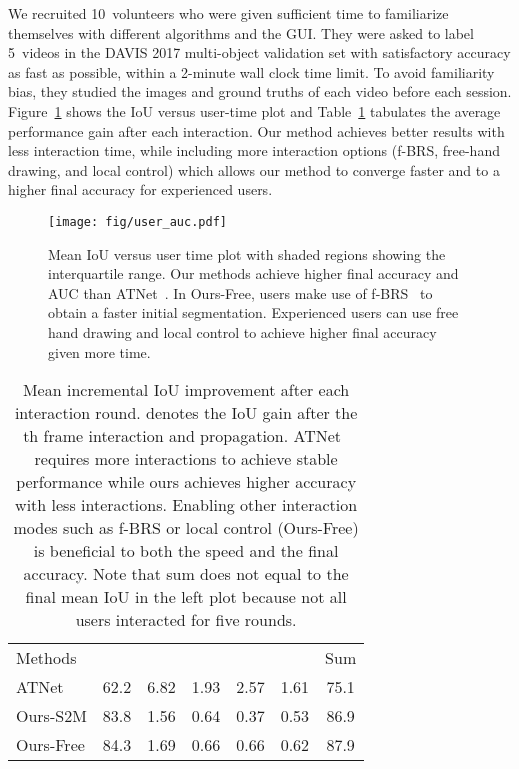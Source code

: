 \documentclass[final]{cvpr}
\begin{document}
	We recruited 10~volunteers who were given sufficient time to familiarize themselves with different algorithms and the GUI. They were asked to label 5~videos in the DAVIS 2017 multi-object validation set with satisfactory accuracy as fast as possible, within a 2-minute wall clock time limit. To avoid familiarity bias, they studied the images and ground truths of each video before each session. Figure~\ref{fig:user_auc} shows the IoU versus user-time plot and Table~\ref{tab:user_delta} tabulates the average performance gain after each interaction. Our method achieves better results with less interaction time, while including more interaction options (f-BRS, free-hand drawing, and local control) which allows our method to converge faster and to a higher final accuracy for experienced users.


	\begin{figure}[h]
		\begin{center}
			\texttt{[image: fig/user\_auc.pdf]}
		\end{center}
		\vspace{-0.2in}
		\caption{
			Mean IoU versus user time plot with shaded regions showing the interquartile range. Our methods achieve higher final accuracy and AUC than ATNet~\cite{Yuk2020IVOSGlobalLocal}. In Ours-Free, users make use of f-BRS~\cite{sofiiuk2020fbrs} to obtain a faster initial segmentation. Experienced users can use free hand drawing and local control to achieve  higher final accuracy given more time. 
		}
		\label{fig:user_auc}
		\vspace{-0.2in}
	\end{figure}
	
	\begin{table}[h]
		\centering
		\small
		\vspace{-0.05in}
		\begin{tabular}{l|c|c|c|c|c|c}
			\hline
			Methods &   &   &  &  &  & Sum\\
			\Xhline{3\arrayrulewidth}
			ATNet~\cite{Yuk2020IVOSGlobalLocal} & 62.2 & 6.82 & 1.93 & 2.57 & 1.61 & 75.1 \\
			Ours-S2M & 83.8 & 1.56 & 0.64 & 0.37 & 0.53 & 86.9 \\
			Ours-Free & 84.3 & 1.69 & 0.66 & 0.66 & 0.62 & 87.9 \\
\hline
		\end{tabular}
		\vspace{0.1in}
		\caption{Mean incremental IoU improvement after each interaction round.  denotes the IoU gain after the th frame interaction and propagation. ATNet~\cite{Yuk2020IVOSGlobalLocal} requires more interactions to achieve stable performance while ours achieves higher accuracy with less interactions.
			Enabling other interaction modes such as f-BRS or local control (Ours-Free) is beneficial to both the speed and the final accuracy. Note that sum does not equal to the final mean IoU in the left plot because not all users interacted for five rounds.}
		\label{tab:user_delta}
		\vspace{-0.15in}
	\end{table}
\end{document}
